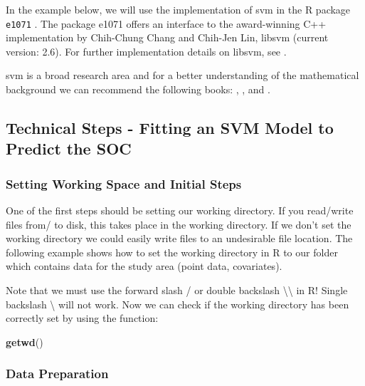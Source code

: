 \documentclass[10pt,b5paper,]{book}
\newenvironment{Shaded}{\begin{snugshade}}{\end{snugshade}}
\newcommand{\KeywordTok}[1]{\textcolor[rgb]{0.13,0.29,0.53}{\textbf{#1}}}
\newcommand{\NormalTok}[1]{#1}
\theoremstyle{definition}
\theoremstyle{definition}
\theoremstyle{definition}
\theoremstyle{remark}
\begin{document}
In the example below, we will use the implementation of svm in the R
package \texttt{e1071} \citep{e1071}. The package e1071 offers an
interface to the award-winning C++ implementation by Chih-Chung Chang
and Chih-Jen Lin, libsvm (current version: 2.6). For further
implementation details on libsvm, see \citet{chang2001libsvm}.

svm is a broad research area and for a better understanding of the
mathematical background we can recommend the following books:
\citet{vapnik2013nature}, \citet{friedman2001elements}, and
\citet{james2013introduction}.

\hypertarget{technical-steps---fitting-an-svm-model-to-predict-the-soc}{%
\subsection{Technical Steps - Fitting an SVM Model to Predict the
SOC}\label{technical-steps---fitting-an-svm-model-to-predict-the-soc}}

\hypertarget{setting-working-space-and-initial-steps-1}{%
\subsubsection{Setting Working Space and Initial
Steps}\label{setting-working-space-and-initial-steps-1}}

One of the first steps should be setting our working directory. If you
read/write files from/ to disk, this takes place in the working
directory. If we don't set the working directory we could easily write
files to an undesirable file location. The following example shows how
to set the working directory in R to our folder which contains data for
the study area (point data, covariates).

Note that we must use the forward slash / or double backslash
\textbackslash{}\textbackslash{} in R! Single backslash \textbackslash{}
will not work. Now we can check if the working directory has been
correctly set by using the function:

\begin{Shaded}
\begin{Highlighting}[]
\KeywordTok{getwd}\NormalTok{()}
\end{Highlighting}
\end{Shaded}

\hypertarget{data-preparation-3}{%
\subsubsection{Data Preparation}\label{data-preparation-3}}
\end{document}
